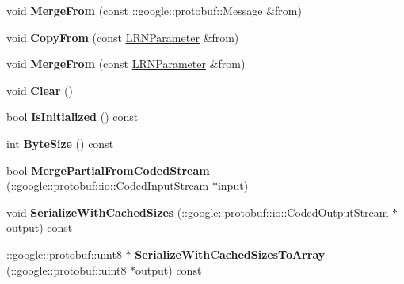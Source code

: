 \begin{DoxyCompactItemize}
void {\bfseries Merge\+From} (const \+::google\+::protobuf\+::\+Message \&from)
\item 
\mbox{\label{classcaffe_1_1_l_r_n_parameter_a40a976b504944c0588a79371b568a969}} 
void {\bfseries Copy\+From} (const \mbox{\hyperlink{classcaffe_1_1_l_r_n_parameter}{L\+R\+N\+Parameter}} \&from)
\item 
\mbox{\label{classcaffe_1_1_l_r_n_parameter_a35d935475db9414b1cb34db9d95a2bb8}} 
void {\bfseries Merge\+From} (const \mbox{\hyperlink{classcaffe_1_1_l_r_n_parameter}{L\+R\+N\+Parameter}} \&from)
\item 
\mbox{\label{classcaffe_1_1_l_r_n_parameter_a816269e807a9af64c744477914be510c}} 
void {\bfseries Clear} ()
\item 
\mbox{\label{classcaffe_1_1_l_r_n_parameter_afef3b6bd02c156e16b3909f3689fac7c}} 
bool {\bfseries Is\+Initialized} () const
\item 
\mbox{\label{classcaffe_1_1_l_r_n_parameter_aa256a5df5bdd0d4024273549d7645a93}} 
int {\bfseries Byte\+Size} () const
\item 
\mbox{\label{classcaffe_1_1_l_r_n_parameter_a5f86ec9e16e36d5464b222bdd5731bdb}} 
bool {\bfseries Merge\+Partial\+From\+Coded\+Stream} (\+::google\+::protobuf\+::io\+::\+Coded\+Input\+Stream $\ast$input)
\item 
\mbox{\label{classcaffe_1_1_l_r_n_parameter_a7fc4d521c9d9e029715bd32465113705}} 
void {\bfseries Serialize\+With\+Cached\+Sizes} (\+::google\+::protobuf\+::io\+::\+Coded\+Output\+Stream $\ast$output) const
\item 
\mbox{\label{classcaffe_1_1_l_r_n_parameter_a8c6c5cf6440154e794b9a37e4c4d8713}} 
\+::google\+::protobuf\+::uint8 $\ast$ {\bfseries Serialize\+With\+Cached\+Sizes\+To\+Array} (\+::google\+::protobuf\+::uint8 $\ast$output) const
\item 
\mbox{\label{classcaffe_1_1_l_r_n_parameter_a9ce2131a863ba06b223c6a2b68b39e4b}} 

\end{DoxyCompactItemize}

